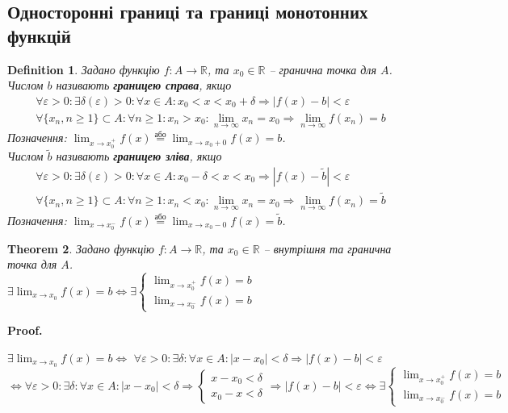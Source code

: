 \documentclass[a4paper, 14pt]{article}
\makeatletter
\def\qed{$\blacksquare$}
\theoremstyle{theoremdd}
\newtheorem{theorem}{Theorem}[subsection]
\theoremstyle{theoremdd}
\newtheorem{definition}[theorem]{Definition}
\theoremstyle{theoremdd}
\theoremstyle{theoremdd}
\theoremstyle{theoremdd}
\theoremstyle{theoremdd}
\theoremstyle{theoremdd}
\theoremstyle{theoremdd}
\renewenvironment{proof}[1][Proof.\\]{\par
\pushQED{\hfill \qed}%
\normalfont \topsep6\p@\@plus6\p@\relax
\trivlist
\item\relax
{\bfseries
#1\@addpunct{.}}\hspace\labelsep\ignorespaces
}{%
\popQED\endtrivlist\@endpefalse
}
\makeatother
\begin{document}
	\subsection{Односторонні границі та границі монотонних функцій}
\begin{definition}
Задано функцію $f \colon A \to \mathbb{R}$, та $x_0 \in \mathbb{R}$ -- гранична точка для $A$.\\
Числом $b$ називають \textbf{границею справа}, якщо
\begin{align*}
\forall \varepsilon > 0: \exists \delta(\varepsilon)>0: \forall x \in A: x_0<x<x_0+\delta \Rightarrow |f(x)-b|<\varepsilon \tag*{означення Коші}\\
\forall \{x_n,n\geq 1\} \subset A: \forall n \geq 1: x_n > x_0: \lim_{n \to \infty}x_n = x_0 \Rightarrow \lim_{n \to \infty}f(x_n) = b \tag*{означення Гайне}
\end{align*}
Позначення: $\displaystyle\lim_{x \to x_0^+} f(x) \overset{\text{або}}{=} \lim_{x \to x_0+0} f(x) = b$.\\
Числом $\tilde{b}$ називають \textbf{границею зліва}, якщо
\begin{align*}
\forall \varepsilon > 0: \exists \delta(\varepsilon)>0: \forall x \in A:  x_0-\delta<x<x_0 \Rightarrow |f(x)-\tilde{b}|<\varepsilon \tag*{означення Коші}\\
\forall \{x_n,n\geq 1\} \subset A: \forall n \geq 1: x_n < x_0: \lim_{n \to \infty}x_n = x_0 \Rightarrow \lim_{n \to \infty}f(x_n) = \tilde{b} \tag*{означення Гайне}
\end{align*}
Позначення: $\displaystyle\lim_{x \to x_0^-} f(x) \overset{\text{або}}{=} \lim_{x \to x_0-0} f(x) = \tilde{b}$.
\end{definition}

\begin{theorem}
Задано функцію $f \colon A \to \mathbb{R}$, та $x_0 \in \mathbb{R}$ -- внутрішня та гранична точка для $A$.\\
$\exists \displaystyle \lim_{x \to x_0} f(x) = b \iff \exists \begin{cases} \displaystyle \lim_{x \to x_0^+} f(x) = b \\ \displaystyle \lim_{x \to x_0^-} f(x) = b \end{cases}$
\end{theorem}

\begin{proof}
$\exists \displaystyle \lim_{x \to x_0} f(x) = b \iff$
$\forall \varepsilon > 0: \exists \delta: \forall x \in A: |x-x_0|<\delta \Rightarrow |f(x)-b|<\varepsilon$\\
$\iff \forall \varepsilon > 0: \exists \delta: \forall x \in A: |x-x_0|<\delta \Rightarrow \begin{cases} x-x_0<\delta \\ x_0-x<\delta \end{cases} \Rightarrow |f(x)-b|<\varepsilon \iff \exists \begin{cases} \displaystyle \lim_{x \to x_0^+} f(x) = b \\ \displaystyle \lim_{x \to x_0^-} f(x) = b \end{cases}$
\end{proof}
\end{document}
